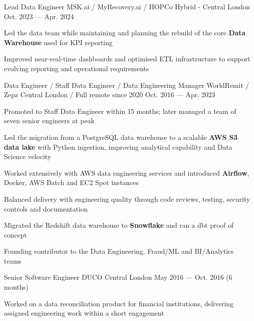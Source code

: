 \begin{cventries}
  \cventry
  {Lead Data Engineer} %
  {MSK.ai / MyRecovery.ai / HOPCo} %
  {Hybrid - Central London} %
  {Oct. 2023 --- Apr. 2024} %
  {
    \begin{cvitems} %
    \item {Led the data team while maintaining and planning the rebuild of the core \textbf{Data Warehouse} used for KPI reporting}
    \item {Improved near-real-time dashboards and optimised ETL infrastructure to support evolving reporting and operational requirements}
    \end{cvitems}
  }

  \cventry
  {Data Engineer / Staff Data Engineer / Data Engineering Manager} %
  {WorldRemit / Zepz} %
  {Central London / Full remote since 2020} %
  {Oct. 2016 --- Apr. 2023} %
  {
    \begin{cvitems} %
    \item {Promoted to Staff Data Engineer within 15 months; later managed a team of seven senior engineers at peak}
    \item {Led the migration from a PostgreSQL data warehouse to a scalable \textbf{AWS S3 data lake} with Python ingestion, improving analytical capability and Data Science velocity}
    \item {Worked extensively with AWS data engineering services and introduced \textbf{Airflow}, Docker, AWS Batch and EC2 Spot instances}
    \item {Balanced delivery with engineering quality through code reviews, testing, security controls and documentation}
    \item {Migrated the Redshift data warehouse to \textbf{Snowflake} and ran a dbt proof of concept}
    \item {Founding contributor to the Data Engineering, Fraud/ML and BI/Analytics teams}
    \end{cvitems}
  }

  \cventry
  {Senior Software Engineer} %
  {DUCO} %
  {Central London} %
  {May 2016 --- Oct. 2016 (6 months)} %
  {
    \begin{cvitems} %
    \item {Worked on a data reconciliation product for financial institutions, delivering assigned engineering work within a short engagement}
    \end{cvitems}
  }


\end{cventries}
